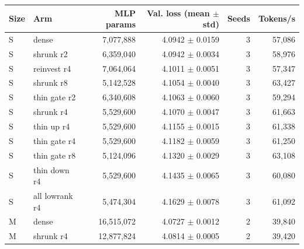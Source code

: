 \begin{tabular}{llrrrr}
\toprule
Size & Arm & MLP params & Val. loss (mean $\pm$ std) & Seeds & Tokens/s \\
\midrule
S & dense & 7,077,888 & 4.0942 $\pm$ 0.0159 & 3 & 57,086 \\
S & shrunk r2 & 6,359,040 & 4.0942 $\pm$ 0.0034 & 3 & 58,976 \\
S & reinvest r4 & 7,064,064 & 4.1011 $\pm$ 0.0051 & 3 & 57,347 \\
S & shrunk r8 & 5,142,528 & 4.1054 $\pm$ 0.0040 & 3 & 63,427 \\
S & thin gate r2 & 6,340,608 & 4.1063 $\pm$ 0.0060 & 3 & 59,294 \\
S & shrunk r4 & 5,529,600 & 4.1070 $\pm$ 0.0047 & 3 & 61,663 \\
S & thin up r4 & 5,529,600 & 4.1155 $\pm$ 0.0015 & 3 & 61,338 \\
S & thin gate r4 & 5,529,600 & 4.1182 $\pm$ 0.0059 & 3 & 61,250 \\
S & thin gate r8 & 5,124,096 & 4.1320 $\pm$ 0.0029 & 3 & 63,108 \\
S & thin down r4 & 5,529,600 & 4.1435 $\pm$ 0.0065 & 3 & 60,080 \\
S & all lowrank r4 & 5,474,304 & 4.1629 $\pm$ 0.0078 & 3 & 61,092 \\
\midrule
M & dense & 16,515,072 & 4.0727 $\pm$ 0.0012 & 2 & 39,840 \\
M & shrunk r4 & 12,877,824 & 4.0814 $\pm$ 0.0005 & 2 & 39,420 \\
\bottomrule
\end{tabular}
